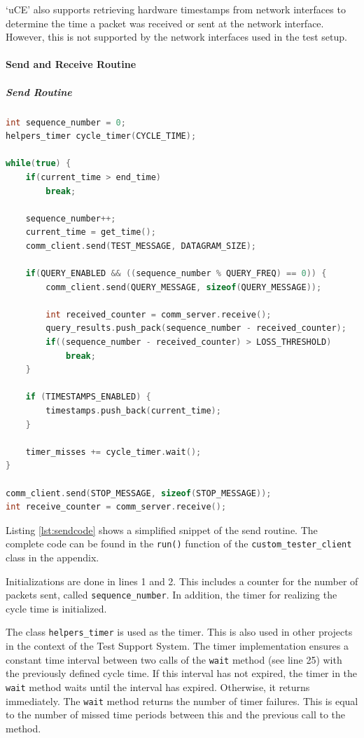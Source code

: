 `uCE' also supports retrieving hardware timestamps from network interfaces to determine the time a packet was received or sent at the network interface. However, this is not supported by the network interfaces used in the test setup.

\paragraph{Send and Receive Routine}
\subparagraph{Send Routine}

\begin{lstlisting}[language=C++, caption=Simplified Code of the Send Routine., label=lst:sendcode]
int sequence_number = 0;
helpers_timer cycle_timer(CYCLE_TIME);

while(true) {
    if(current_time > end_time)
        break;

    sequence_number++;
    current_time = get_time();
    comm_client.send(TEST_MESSAGE, DATAGRAM_SIZE);

    if(QUERY_ENABLED && ((sequence_number % QUERY_FREQ) == 0)) {
        comm_client.send(QUERY_MESSAGE, sizeof(QUERY_MESSAGE));
          
        int received_counter = comm_server.receive();
        query_results.push_pack(sequence_number - received_counter);
        if((sequence_number - received_counter) > LOSS_THRESHOLD)
            break;
    }
  
    if (TIMESTAMPS_ENABLED) {
        timestamps.push_back(current_time);
    }

    timer_misses += cycle_timer.wait();
}

comm_client.send(STOP_MESSAGE, sizeof(STOP_MESSAGE));
int receive_counter = comm_server.receive();
\end{lstlisting}

Listing \ref{lst:sendcode} shows a simplified snippet of the send routine. The complete code can be found in the \texttt{run()} function of the \texttt{custom\_tester\_client} class in the appendix.

Initializations are done in lines 1 and 2. This includes a counter for the number of packets sent, called \texttt{sequence\_number}. In addition, the timer for realizing the cycle time is initialized.

The class \texttt{helpers\_timer} is used as the timer. This is also used in other projects in the context of the Test Support System. The timer implementation ensures a constant time interval between two calls of the \texttt{wait} method (see line 25) with the previously defined cycle time. If this interval has not expired, the timer in the \texttt{wait} method waits until the interval has expired. Otherwise, it returns immediately. The \texttt{wait} method returns the number of timer failures. This is equal to the number of missed time periods between this and the previous call to the method.

